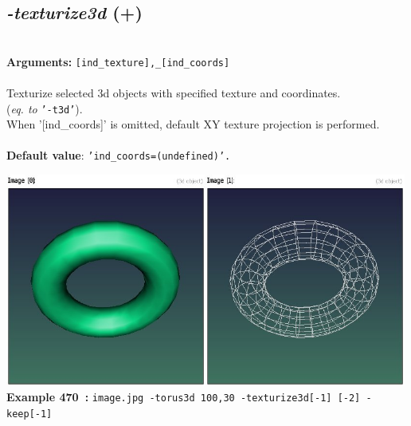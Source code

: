 \documentclass[a4paper,11pt,twoside]{book}
\begin{document}
\subsection{\emph{-texturize3d} (+)}\vspace*{-0.5em}
~\\\textbf{Arguments: } 
{\small \texttt{[ind\_texture],\_[ind\_coords]}}\\~\\
Texturize selected 3d objects with specified texture and coordinates.
~\\(\emph{eq. to} {\small \texttt{'-t3d'}}).
~\\When '[ind\_coords]' is omitted, default XY texture projection is performed.
~\\~\\\textbf{Default value}: {\small \texttt{'ind\_coords=(undefined)'.}}
\begin{center}\includegraphics[keepaspectratio=true,height=7cm,width=\textwidth]{img/gmic_def470.jpg}\\
{\footnotesize \textbf{Example 470~:} \texttt{image.jpg -torus3d 100,30 -texturize3d[-1] [-2] -keep[-1]}}
\end{center}
\end{document}
